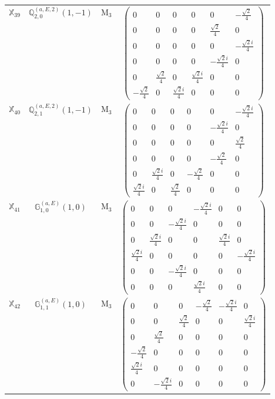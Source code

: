 \documentclass[fleqn,10pt,landscape]{article}
\begin{document}
\begin{itemize}
\begin{center}
\begin{longtable}{c|c|c|c}
$ \mathbb{X}_{39} $ & $\mathbb{Q}_{2,0}^{(a,E,2)}(1,-1)$ & M$_{3}$ & $\begin{pmatrix} 0 & 0 & 0 & 0 & 0 & - \frac{\sqrt{2}}{4} \\ 0 & 0 & 0 & 0 & \frac{\sqrt{2}}{4} & 0 \\ 0 & 0 & 0 & 0 & 0 & - \frac{\sqrt{2} i}{4} \\ 0 & 0 & 0 & 0 & - \frac{\sqrt{2} i}{4} & 0 \\ 0 & \frac{\sqrt{2}}{4} & 0 & \frac{\sqrt{2} i}{4} & 0 & 0 \\ - \frac{\sqrt{2}}{4} & 0 & \frac{\sqrt{2} i}{4} & 0 & 0 & 0 \end{pmatrix}$ \\
$ \mathbb{X}_{40} $ & $\mathbb{Q}_{2,1}^{(a,E,2)}(1,-1)$ & M$_{3}$ & $\begin{pmatrix} 0 & 0 & 0 & 0 & 0 & - \frac{\sqrt{2} i}{4} \\ 0 & 0 & 0 & 0 & - \frac{\sqrt{2} i}{4} & 0 \\ 0 & 0 & 0 & 0 & 0 & \frac{\sqrt{2}}{4} \\ 0 & 0 & 0 & 0 & - \frac{\sqrt{2}}{4} & 0 \\ 0 & \frac{\sqrt{2} i}{4} & 0 & - \frac{\sqrt{2}}{4} & 0 & 0 \\ \frac{\sqrt{2} i}{4} & 0 & \frac{\sqrt{2}}{4} & 0 & 0 & 0 \end{pmatrix}$ \\
$ \mathbb{X}_{41} $ & $\mathbb{G}_{1,0}^{(a,E)}(1,0)$ & M$_{3}$ & $\begin{pmatrix} 0 & 0 & 0 & - \frac{\sqrt{2} i}{4} & 0 & 0 \\ 0 & 0 & - \frac{\sqrt{2} i}{4} & 0 & 0 & 0 \\ 0 & \frac{\sqrt{2} i}{4} & 0 & 0 & \frac{\sqrt{2} i}{4} & 0 \\ \frac{\sqrt{2} i}{4} & 0 & 0 & 0 & 0 & - \frac{\sqrt{2} i}{4} \\ 0 & 0 & - \frac{\sqrt{2} i}{4} & 0 & 0 & 0 \\ 0 & 0 & 0 & \frac{\sqrt{2} i}{4} & 0 & 0 \end{pmatrix}$ \\
$ \mathbb{X}_{42} $ & $\mathbb{G}_{1,1}^{(a,E)}(1,0)$ & M$_{3}$ & $\begin{pmatrix} 0 & 0 & 0 & - \frac{\sqrt{2}}{4} & - \frac{\sqrt{2} i}{4} & 0 \\ 0 & 0 & \frac{\sqrt{2}}{4} & 0 & 0 & \frac{\sqrt{2} i}{4} \\ 0 & \frac{\sqrt{2}}{4} & 0 & 0 & 0 & 0 \\ - \frac{\sqrt{2}}{4} & 0 & 0 & 0 & 0 & 0 \\ \frac{\sqrt{2} i}{4} & 0 & 0 & 0 & 0 & 0 \\ 0 & - \frac{\sqrt{2} i}{4} & 0 & 0 & 0 & 0 \end{pmatrix}$ \\

\end{longtable}
\end{center}
\end{itemize}
\end{document}
